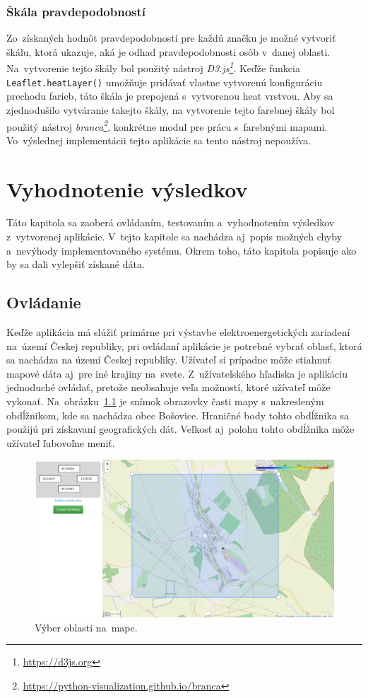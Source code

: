 \subsection*{Škála pravdepodobností}
Zo~získaných hodnôt pravdepodobností pre každú značku je možné vytvoriť škálu, ktorá ukazuje, aká je odhad pravdepodobnosti osôb v~danej oblasti. Na~vytvorenie tejto škály bol použitý nástroj \emph{D3.js\footnote{\url{https://d3js.org}}}. Keďže funkcia \texttt{Leaflet.heatLayer()} umožňuje pridávať vlastne vytvorenú konfiguráciu prechodu farieb, táto škála je prepojená s~vytvorenou heat vrstvou. Aby sa zjednodušilo vytváranie takejto škály, na vytvorenie tejto farebnej škály bol použitý nástroj \emph{branca\footnote{\url{https://python-visualization.github.io/branca}}}, konkrétne modul pre prácu s~farebnými mapami. Vo~výslednej implementácii tejto aplikácie sa tento nástroj nepoužíva.



\chapter{Vyhodnotenie výsledkov}
\label{vyhodnotenie}
Táto kapitola sa zaoberá ovládaním, testovaním a~vyhodnotením výsledkov z~vytvorenej aplikácie. V~tejto kapitole sa nachádza aj~popis možných chyby a~nevýhody implementovaného systému. Okrem toho, táto kapitola popisuje ako by sa dali vylepšiť získané dáta.


\section{Ovládanie}
Keďže aplikácia má slúžiť primárne pri výstavbe elektroenergetických zariadení na~území Českej republiky, pri ovládaní aplikácie je potrebné vybrať oblasť, ktorá sa nachádza na území Českej republiky. Užívateľ si prípadne môže stiahnuť mapové dáta aj~pre iné krajiny na~svete. Z~užívateľského hľadiska je aplikáciu jednoduché ovládať, pretože neobsahuje veľa možností, ktoré užívateľ môže vykonať. Na~obrázku~\ref{fig:bosovice-map} je snímok obrazovky časti mapy s~nakresleným obdĺžnikom, kde sa nachádza obec Bošovice. Hraničné body tohto obdĺžnika sa použijú pri získavaní geografických dát. Veľkosť aj~polohu tohto obdĺžnika môže užívateľ ľubovoľne meniť.

\begin{figure}[ht]
    \centering
    \includegraphics[width=1.0\linewidth]{obrazky-figures/bosovice-map.png}
    \caption{Výber oblasti na~mape.}
    \label{fig:bosovice-map}
\end{figure}


